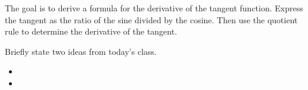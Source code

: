 \begin{problem}
  \clearpage

\item The goal is to derive a formula for the derivative of the
  tangent function. Express the tangent as the ratio of the sine
  divided by the cosine. Then use the quotient rule to determine the
  derivative of the tangent.


  \vfill

\end{problem}

\postClass

\begin{problem}
\item Briefly state two ideas from today's class.
  \begin{itemize}
  \item 
  \item 
  \end{itemize}
\item 
  \begin{subproblem}
    \item
  \end{subproblem}
\end{problem}



